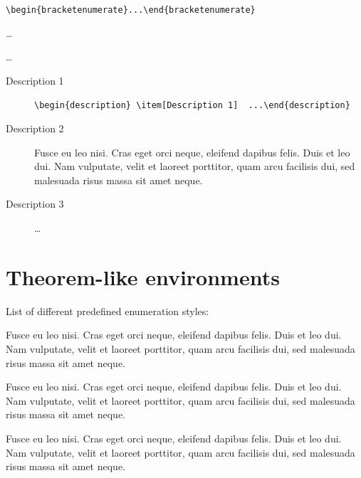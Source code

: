 \documentclass[a4paper,UKenglish,cleveref, autoref]{lipics-v2019}
\begin{document}
\begin{bracketenumerate}
\item \verb|\begin{bracketenumerate}...\end{bracketenumerate}|
\item \dots
\item \dots
\end{bracketenumerate}

\begin{description}
\item[Description 1] \verb|\begin{description} \item[Description 1]  ...\end{description}|
\item[Description 2] Fusce eu leo nisi. Cras eget orci neque, eleifend dapibus felis. Duis et leo dui. Nam vulputate, velit et laoreet porttitor, quam arcu facilisis dui, sed malesuada risus massa sit amet neque.
\item[Description 3]  \dots
\end{description}

\section{Theorem-like environments}\label{sec:theorem-environments}

List of different predefined enumeration styles:

\begin{theorem}\label{testenv-theorem}
Fusce eu leo nisi. Cras eget orci neque, eleifend dapibus felis. Duis et leo dui. Nam vulputate, velit et laoreet porttitor, quam arcu facilisis dui, sed malesuada risus massa sit amet neque.
\end{theorem}

\begin{lemma}\label{testenv-lemma}
Fusce eu leo nisi. Cras eget orci neque, eleifend dapibus felis. Duis et leo dui. Nam vulputate, velit et laoreet porttitor, quam arcu facilisis dui, sed malesuada risus massa sit amet neque.
\end{lemma}

\begin{corollary}\label{testenv-corollary}
Fusce eu leo nisi. Cras eget orci neque, eleifend dapibus felis. Duis et leo dui. Nam vulputate, velit et laoreet porttitor, quam arcu facilisis dui, sed malesuada risus massa sit amet neque.
\end{corollary}
\end{document}
